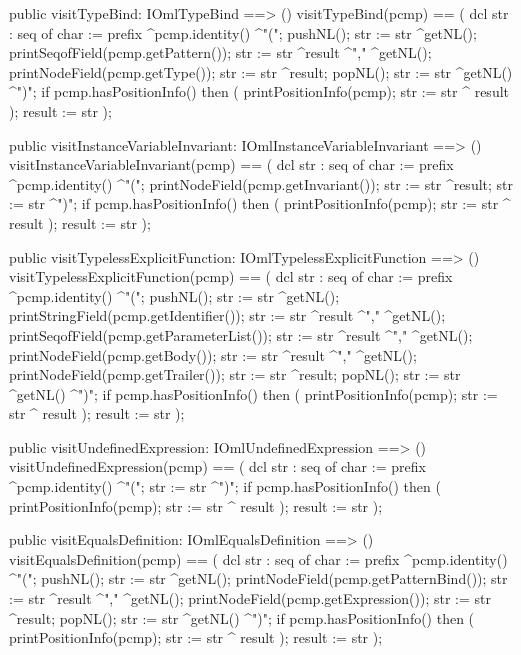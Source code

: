 \begin{vdm_al}
  public visitTypeBind: IOmlTypeBind ==> ()
  visitTypeBind(pcmp) ==
    ( dcl str : seq of char := prefix ^pcmp.identity() ^"(";
      pushNL();
      str := str ^getNL();
      printSeqofField(pcmp.getPattern());
      str := str ^result ^"," ^getNL();
      printNodeField(pcmp.getType());
      str := str ^result;
      popNL();
      str := str ^getNL() ^")";
      if pcmp.hasPositionInfo()
      then ( printPositionInfo(pcmp);
             str := str ^ result );
      result := str );

  public visitInstanceVariableInvariant: IOmlInstanceVariableInvariant ==> ()
  visitInstanceVariableInvariant(pcmp) ==
    ( dcl str : seq of char := prefix ^pcmp.identity() ^"(";
      printNodeField(pcmp.getInvariant());
      str := str ^result;
      str := str ^")";
      if pcmp.hasPositionInfo()
      then ( printPositionInfo(pcmp);
             str := str ^ result );
      result := str );

  public visitTypelessExplicitFunction: IOmlTypelessExplicitFunction ==> ()
  visitTypelessExplicitFunction(pcmp) ==
    ( dcl str : seq of char := prefix ^pcmp.identity() ^"(";
      pushNL();
      str := str ^getNL();
      printStringField(pcmp.getIdentifier());
      str := str ^result ^"," ^getNL();
      printSeqofField(pcmp.getParameterList());
      str := str ^result ^"," ^getNL();
      printNodeField(pcmp.getBody());
      str := str ^result ^"," ^getNL();
      printNodeField(pcmp.getTrailer());
      str := str ^result;
      popNL();
      str := str ^getNL() ^")";
      if pcmp.hasPositionInfo()
      then ( printPositionInfo(pcmp);
             str := str ^ result );
      result := str );

  public visitUndefinedExpression: IOmlUndefinedExpression ==> ()
  visitUndefinedExpression(pcmp) ==
    ( dcl str : seq of char := prefix ^pcmp.identity() ^"(";
      str := str ^")";
      if pcmp.hasPositionInfo()
      then ( printPositionInfo(pcmp);
             str := str ^ result );
      result := str );

  public visitEqualsDefinition: IOmlEqualsDefinition ==> ()
  visitEqualsDefinition(pcmp) ==
    ( dcl str : seq of char := prefix ^pcmp.identity() ^"(";
      pushNL();
      str := str ^getNL();
      printNodeField(pcmp.getPatternBind());
      str := str ^result ^"," ^getNL();
      printNodeField(pcmp.getExpression());
      str := str ^result;
      popNL();
      str := str ^getNL() ^")";
      if pcmp.hasPositionInfo()
      then ( printPositionInfo(pcmp);
             str := str ^ result );
      result := str );


\end{vdm_al}
